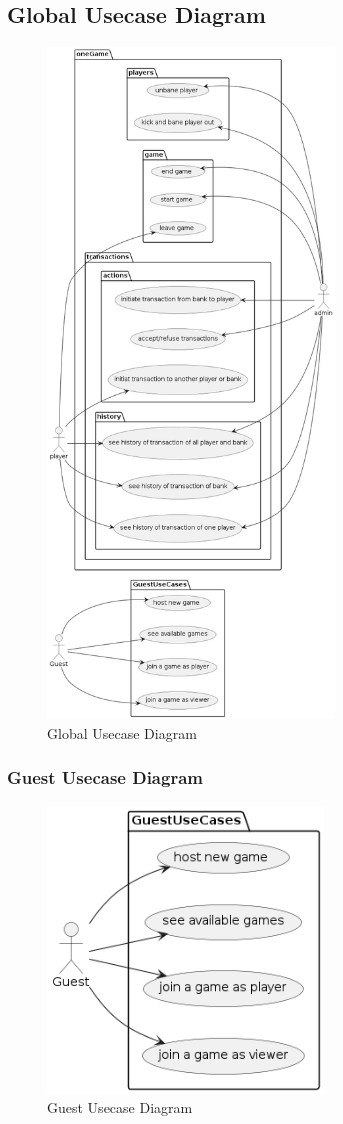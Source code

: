 \documentclass{article}
\begin{document}
\cleardoublepage
\subsection{Global Usecase Diagram}
 \begin{figure}[H]
	 \centering
	 \includegraphics[height=7in]{../thesis_tex/assets/diagrams/global_ucd.png}
	 \caption{Global Usecase Diagram}
\end{figure}
\cleardoublepage

\subsubsection{Guest Usecase Diagram}
 \begin{figure}[H]
	 \centering
	 \includegraphics[height=3in]{../thesis_tex/assets/diagrams/guest_ucd.png}
	 \caption{Guest Usecase Diagram}
\end{figure}
\end{document}
